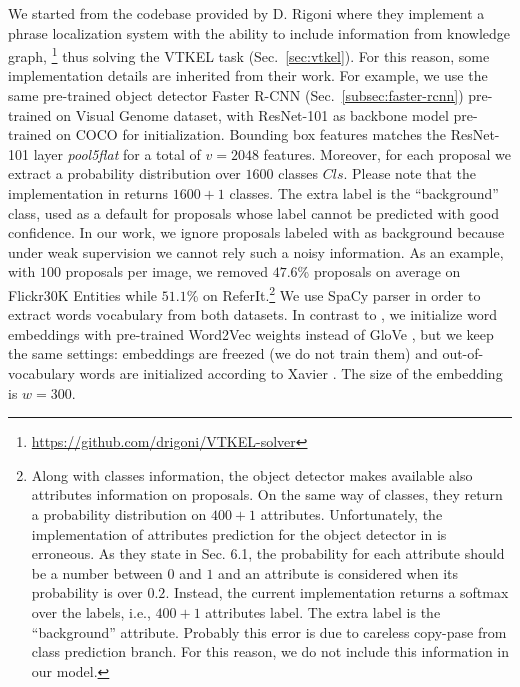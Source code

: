 We started from the codebase provided by D. Rigoni \etal{}
\cite{rigoni2021better} where they implement a phrase localization
system with the ability to include information from knowledge graph,
\footnote{\href{https://github.com/drigoni/VTKEL-solver}{https://github.com/drigoni/VTKEL-solver}}
thus solving the VTKEL task (Sec.~\ref{sec:vtkel}). For this reason,
some implementation details are inherited from their work. For
example, we use the same pre-trained object detector Faster R-CNN
(Sec.~\ref{subsec:faster-rcnn}) pre-trained on Visual Genome
\cite{krishna2017visual} dataset, with ResNet-101 as backbone model
pre-trained on COCO for initialization. Bounding box features matches
the ResNet-101 layer \textit{pool5\textunderscore flat} for a total of
$v = 2048$ features. Moreover, for each proposal we extract a
probability distribution over $1600$ classes $Cls$. Please note that
the implementation in \cite{anderson2018bottom} returns $1600 + 1$
classes. The extra label is the ``background'' class, used as a
default for proposals whose label cannot be predicted with good
confidence. In our work, we ignore proposals labeled with as
background because under weak supervision we cannot rely such a noisy
information. As an example, with $100$ proposals per image, we removed
$47.6$\% proposals on average on Flickr30K Entities while $51.1$\% on
ReferIt.\footnote{Along with classes information, the object detector
makes available also attributes information on proposals. On the same
way of classes, they return a probability distribution on $400 + 1$
attributes. Unfortunately, the implementation of attributes prediction
for the object detector in \cite{anderson2018bottom} is erroneous. As
they state in Sec. 6.1, the probability for each attribute should be a
number between $0$ and $1$ and an attribute is considered when its
probability is over $0.2$. Instead, the current implementation returns
a softmax over the labels, i.e., $400 + 1$ attributes label. The extra
label is the ``background'' attribute. Probably this error is due to
careless copy-pase from class prediction branch. For this reason, we
do not include this information in our model.} We use SpaCy
\cite{honnibal2020spacy} parser in order to extract words vocabulary
from both datasets. In contrast to \cite{rigoni2021better}, we
initialize word embeddings with pre-trained Word2Vec
\cite{mikolov2013efficient} weights instead of GloVe
\cite{pennington2014glove}, but we keep the same settings: embeddings
are freezed (we do not train them) and out-of-vocabulary words are
initialized according to Xavier \cite{glorot2010understanding}. The
size of the embedding is $w = 300$.

